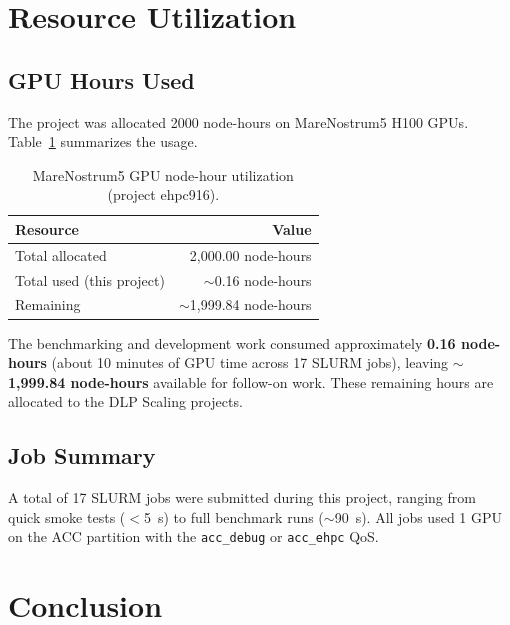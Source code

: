 \documentclass[11pt,a4paper]{article}
\begin{document}
\section{Resource Utilization}

\subsection{GPU Hours Used}

The project was allocated 2000 node-hours on MareNostrum5 H100 GPUs.
Table~\ref{tab:gpu-hours} summarizes the usage.

\begin{table}[h]
\centering
\caption{MareNostrum5 GPU node-hour utilization (project ehpc916).}
\label{tab:gpu-hours}
\begin{tabular}{lr}
\toprule
\textbf{Resource} & \textbf{Value} \\
\midrule
Total allocated & 2{,}000.00 node-hours \\
Total used (this project) & $\sim$0.16 node-hours \\
\midrule
Remaining & $\sim$1{,}999.84 node-hours \\
\bottomrule
\end{tabular}
\end{table}

The benchmarking and development work consumed approximately
\textbf{0.16 node-hours} (about 10 minutes of GPU time across 17 SLURM
jobs), leaving \textbf{$\sim$1{,}999.84 node-hours} available for
follow-on work. These remaining hours are allocated to the DLP Scaling
projects.

\subsection{Job Summary}

A total of 17 SLURM jobs were submitted during this project, ranging from
quick smoke tests ($<$\SI{5}{s}) to full benchmark runs
($\sim$\SI{90}{s}). All jobs used 1 GPU on the ACC partition with the
\texttt{acc\_debug} or \texttt{acc\_ehpc} QoS.

\section{Conclusion}
\end{document}
